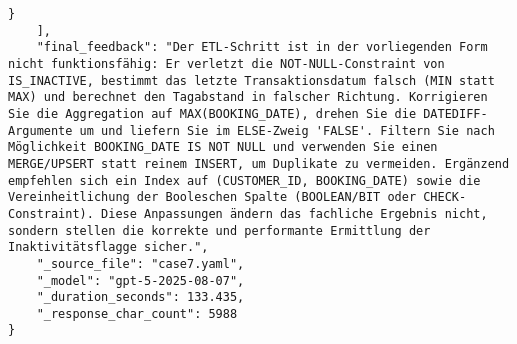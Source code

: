 \begin{lstlisting}[caption={Ausgabe: GPT-5 Anwendungsfall 7 Robustheitsdurchlauf},label={gpt_case7_prompt3}]
        }
    ],
    "final_feedback": "Der ETL-Schritt ist in der vorliegenden Form nicht funktionsfähig: Er verletzt die NOT-NULL-Constraint von IS_INACTIVE, bestimmt das letzte Transaktionsdatum falsch (MIN statt MAX) und berechnet den Tagabstand in falscher Richtung. Korrigieren Sie die Aggregation auf MAX(BOOKING_DATE), drehen Sie die DATEDIFF-Argumente um und liefern Sie im ELSE-Zweig 'FALSE'. Filtern Sie nach Möglichkeit BOOKING_DATE IS NOT NULL und verwenden Sie einen MERGE/UPSERT statt reinem INSERT, um Duplikate zu vermeiden. Ergänzend empfehlen sich ein Index auf (CUSTOMER_ID, BOOKING_DATE) sowie die Vereinheitlichung der Booleschen Spalte (BOOLEAN/BIT oder CHECK-Constraint). Diese Anpassungen ändern das fachliche Ergebnis nicht, sondern stellen die korrekte und performante Ermittlung der Inaktivitätsflagge sicher.",
    "_source_file": "case7.yaml",
    "_model": "gpt-5-2025-08-07",
    "_duration_seconds": 133.435,
    "_response_char_count": 5988
}
\end{lstlisting}

